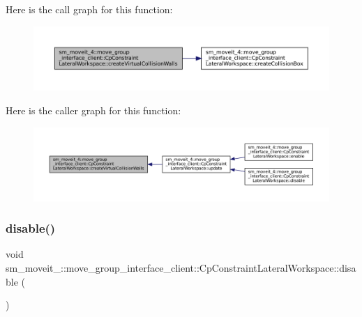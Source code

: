 Here is the call graph for this function\+:
\nopagebreak
\begin{figure}[H]
\begin{center}
\leavevmode
\includegraphics[width=350pt]{classsm__moveit__4_1_1move__group__interface__client_1_1CpConstraintLateralWorkspace_a8c1b043abc9d74c603becad16ddcc420_cgraph}
\end{center}
\end{figure}
Here is the caller graph for this function\+:
\nopagebreak
\begin{figure}[H]
\begin{center}
\leavevmode
\includegraphics[width=350pt]{classsm__moveit__4_1_1move__group__interface__client_1_1CpConstraintLateralWorkspace_a8c1b043abc9d74c603becad16ddcc420_icgraph}
\end{center}
\end{figure}
\mbox{\label{classsm__moveit__4_1_1move__group__interface__client_1_1CpConstraintLateralWorkspace_a2e14acb1788f7592882e246ad093a360}} 
\subsubsection{\texorpdfstring{disable()}{disable()}}
{\footnotesize\ttfamily void sm\+\_\+moveit\+\_\+::move\+\_\+group\+\_\+interface\+\_\+client\+::\+Cp\+Constraint\+Lateral\+Workspace\+::disable (\begin{DoxyParamCaption}{ }\end{DoxyParamCaption})}



